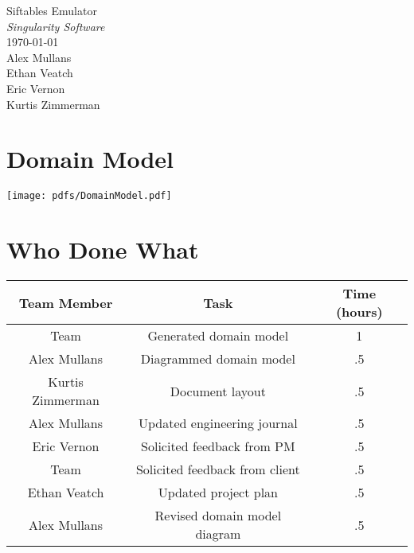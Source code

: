 \documentclass[12pt]{article}
\begin{document}
\vspace*{\fill}
        \begin{center}
                \LARGE{Siftables Emulator} \\
                \LARGE{\textit{Singularity Software}} \\
                \vspace{.15in}
                \large{\today} \\
                \vspace{4in}
                        Alex Mullans \\
                        Ethan Veatch \\
                        Eric Vernon \\
                        Kurtis Zimmerman
        \end{center}
\vspace*{\fill}
\thispagestyle{empty}

\section{Domain Model}
\texttt{[image: pdfs/DomainModel.pdf]}

\section{Who Done What}
\begin{center}
\begin{tabular}{| c | c | c |}
            \hline

            \textbf{Team Member} &
            \textbf{Task} &
            \textbf{Time (hours)} \\ \hline

            Team &
            Generated domain model &
            1 \\ \hline

            Alex Mullans &
            Diagrammed domain model &
            .5 \\ \hline

            Kurtis Zimmerman &
            Document layout &
            .5 \\ \hline

            Alex Mullans &
            Updated engineering journal &
            .5 \\ \hline

            Eric Vernon &
            Solicited feedback from PM &
            .5 \\ \hline

            Team &
            Solicited feedback from client &
            .5 \\ \hline

            Ethan Veatch &
            Updated project plan &
            .5 \\ \hline

            Alex Mullans &
            Revised domain model diagram &
            .5 \\ \hline

\end{tabular}
\end{center}
        
\end{document}
